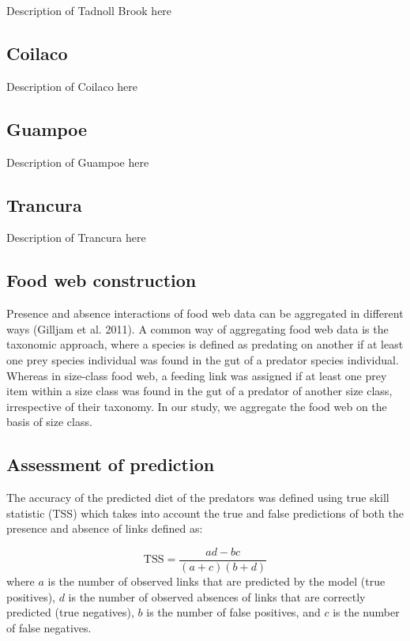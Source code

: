 \documentclass{article}
\begin{document}
Description of Tadnoll Brook here

\hypertarget{coilaco}{%
\subsection{Coilaco}\label{coilaco}}

Description of Coilaco here

\hypertarget{guampoe}{%
\subsection{Guampoe}\label{guampoe}}

Description of Guampoe here

\hypertarget{trancura}{%
\subsection{Trancura}\label{trancura}}

Description of Trancura here

\hypertarget{food-web-construction}{%
\subsection{Food web construction}\label{food-web-construction}}

Presence and absence interactions of food web data can be aggregated in
different ways (Gilljam et al. 2011). A common way of aggregating food
web data is the taxonomic approach, where a species is defined as
predating on another if at least one prey species individual was found
in the gut of a predator species individual. Whereas in size-class food
web, a feeding link was assigned if at least one prey item within a size
class was found in the gut of a predator of another size class,
irrespective of their taxonomy. In our study, we aggregate the food web
on the basis of size class.

\hypertarget{assessment-of-prediction}{%
\subsection{Assessment of prediction}\label{assessment-of-prediction}}

The accuracy of the predicted diet of the predators was defined using
true skill statistic (TSS) which takes into account the true and false
predictions of both the presence and absence of links defined as:

\[ \text{TSS} = \frac{ad-bc}{(a+c)(b+d)} \] where \(a\) is the number of
observed links that are predicted by the model (true positives), \(d\)
is the number of observed absences of links that are correctly predicted
(true negatives), \(b\) is the number of false positives, and \(c\) is
the number of false negatives.
\end{document}
